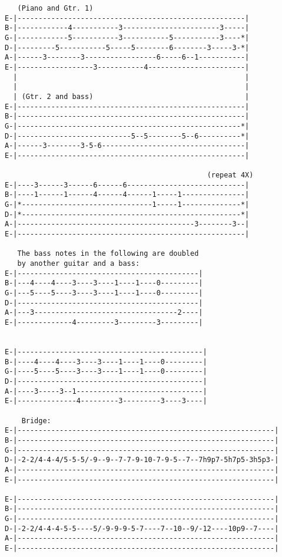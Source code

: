 \begin{verbatim}
   (Piano and Gtr. 1)
E-|------------------------------------------------------|
B-|------------4-----------3-----------------------3-----|
G-|------------5-----------3-----------5-----------3----*|
D-|---------5-----------5-----5--------6--------3-----3-*|
A-|------3--------3-----------------6-----6--1-----------|
E-|------------------3-----------4-----------------------|
  |                                                      |
  |                                                      |
  | (Gtr. 2 and bass)                                    |
E-|------------------------------------------------------|
B-|------------------------------------------------------|
G-|-----------------------------------------------------*|
D-|---------------------------5--5--------5--6----------*|
A-|------3--------3-5-6----------------------------------|
E-|------------------------------------------------------|

                                                (repeat 4X)
E-|----3------3------6------6----------------------------|
B-|----1------1------4------4------1-----1---------------|
G-|*-------------------------------1-----1--------------*|
D-|*----------------------------------------------------*|
A-|------------------------------------------3--------3--|
E-|------------------------------------------------------|

   The bass notes in the following are doubled
   by another guitar and a bass:
E-|-------------------------------------------|
B-|---4----4----3----3----1----1----0---------|
G-|---5----5----3----3----1----1----0---------|
D-|-------------------------------------------|
A-|---3----------------------------------2----|
E-|-------------4---------3---------3---------|


E-|--------------------------------------------|
B-|----4----4----3----3----1----1----0---------|
G-|----5----5----3----3----1----1----0---------|
D-|--------------------------------------------|
A-|----3-----3--1------------------------------|
E-|--------------4---------3---------3----3----|

    Bridge:
E-|-------------------------------------------------------------|
B-|-------------------------------------------------------------|
G-|-------------------------------------------------------------|
D-|-2-2/4-4-4/5-5-5/-9--9--7-7-9-10-7-9-5--7--7h9p7-5h7p5-3h5p3-|
A-|-------------------------------------------------------------|
E-|-------------------------------------------------------------|

E-|-------------------------------------------------------------|
B-|-------------------------------------------------------------|
G-|-------------------------------------------------------------|
D-|-2-2/4-4-4-5-5----5/-9-9-9-5-7----7--10--9/-12----10p9--7----|
A-|-------------------------------------------------------------|
E-|-------------------------------------------------------------|


\end{verbatim}
